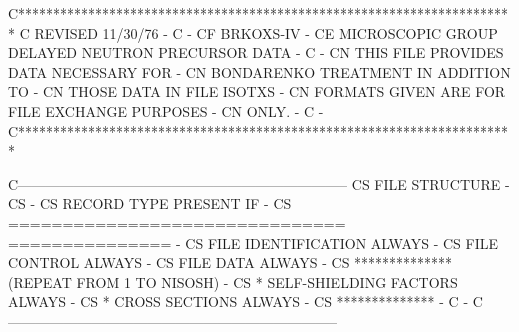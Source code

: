\small
\begin{ccode}

C***********************************************************************
C                       REVISED 11/30/76                               -
C                                                                      -
CF          BRKOXS-IV                                                  -
CE          MICROSCOPIC GROUP DELAYED NEUTRON PRECURSOR DATA           -
C                                                                      -
CN                      THIS FILE PROVIDES DATA NECESSARY FOR          -
CN                      BONDARENKO TREATMENT IN ADDITION TO            -
CN                      THOSE DATA IN FILE ISOTXS                      -
CN                      FORMATS GIVEN ARE FOR FILE EXCHANGE PURPOSES   -
CN                      ONLY.                                          -
C                                                                      -
C***********************************************************************

C-----------------------------------------------------------------------
CS          FILE STRUCTURE                                             -
CS                                                                     -
CS             RECORD TYPE                        PRESENT IF           -
CS             ===============================    ===============      -
CS             FILE IDENTIFICATION                ALWAYS               -
CS             FILE CONTROL                       ALWAYS               -
CS             FILE DATA                          ALWAYS               -
CS   **************(REPEAT FROM 1 TO NISOSH)                           -
CS   *         SELF-SHIELDING FACTORS             ALWAYS               -
CS   *         CROSS SECTIONS                     ALWAYS               -
CS   **************                                                    -
C                                                                      -
C-----------------------------------------------------------------------


\end{ccode}
